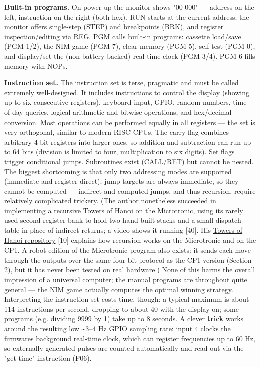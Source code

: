 \documentclass[
  11pt,
  letterpaper,
]{article}
\newcounter{none} %
\begin{document}
\textbf{Built-in programs.} On power-up the monitor shows "00 000" ---
address on the left, instruction on the right (both hex). RUN starts at
the current address; the monitor offers single-step (STEP) and
breakpoints (BRK), and register inspection/editing via REG. PGM calls
built-in programs: cassette load/save (PGM 1/2), the NIM game (PGM 7),
clear memory (PGM 5), self-test (PGM 0), and display/set the
(non-battery-backed) real-time clock (PGM 3/4). PGM 6 fills memory with
NOPs.

\textbf{Instruction set.} The instruction set is terse, pragmatic and
must be called extremely well-designed. It includes instructions to
control the display (showing up to six consecutive registers), keyboard
input, GPIO, random numbers, time-of-day queries, logical-arithmetic and
bitwise operations, and hex/decimal conversion. Most operations can be
performed equally in all registers --- the set is very orthogonal,
similar to modern RISC CPUs. The carry flag combines arbitrary 4-bit
registers into larger ones, so addition and subtraction can run up to 64
bits (division is limited to four, multiplication to six digits). Set
flags trigger conditional jumps. Subroutines exist (CALL/RET) but cannot
be nested. The biggest shortcoming is that only two addressing modes are
supported (immediate and register-direct); jump targets are always
immediate, so they cannot be computed --- indirect and computed jumps,
and thus recursion, require relatively complicated trickery. (The author
nonetheless succeeded in implementing a recursive Towers of Hanoi on the
Microtronic, using its rarely used second register bank to hold two
hand-built stacks and a small dispatch table in place of indirect
returns; a video shows it running {[}40{]}. His
\href{https://github.com/lambdamikel/towers-of-hanoi}{Towers of Hanoi
repository} {[}10{]} explains how recursion works on the Microtronic and
on the CP1. A robot edition of the Microtronic program also exists: it
sends each move through the outputs over the same four-bit protocol as
the CP1 version (Section 2), but it has never been tested on real
hardware.) None of this harms the overall impression of a universal
computer; the manual programs are throughout quite general --- the NIM
game actually computes the optimal winning strategy. Interpreting the
instruction set costs time, though: a typical maximum is about 114
instructions per second, dropping to about 40 with the display on; some
programs (e.g. dividing 9999 by 1) take up to 8 seconds. A clever
\textbf{trick} works around the resulting low \textasciitilde3--4 Hz
GPIO sampling rate: input 4 clocks the firmware\textquotesingle s
background real-time clock, which can register frequencies up to 60 Hz,
so externally generated pulses are counted automatically and read out
via the "get-time" instruction (F06).
\end{document}
